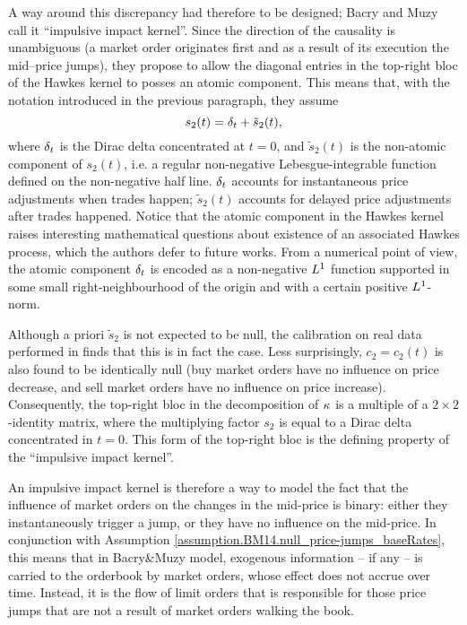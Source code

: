 \documentclass[10pt, article,table]{article}
\begin{document}
A way around this discrepancy had therefore to be designed; Bacry and Muzy call it ``impulsive impact kernel''. 
Since the direction of the causality is unambiguous (a market order originates first and as a result of its execution the mid--price jumps), they propose to allow the diagonal entries in the top-right bloc of the Hawkes kernel to posses an atomic component. This means that,  with the notation introduced in the previous paragraph, they assume 
\begin{equation*}
 s_2(t) = \delta_t + \tilde{s}_2(t),
\end{equation*}
where $\delta_t$ is the Dirac delta concentrated at $t=0$, and $\tilde{s}_2 (t)$ is the non-atomic component of $s_2(t)$, i.e. a regular non-negative Lebesgue-integrable function defined on the non-negative half line. $\delta_t$ accounts for instantaneous price adjustments when trades happen; $\tilde{s}_2 (t)$ accounts for delayed price adjustments after trades happened. Notice that the atomic component in the Hawkes kernel raises interesting mathematical questions about existence of an associated Hawkes process, which the authors defer to future works. From a numerical point of view, the atomic component $\delta_t$ is encoded as a non-negative $L^{1}$ function supported in some small right-neighbourhood of the origin and  with a certain positive $L^{1}$-norm. 

Although a priori $\tilde{s}_2$ is not expected to be null, the calibration on real data performed in \citealp{BM14haw} finds that this is in fact the  case. Less surprisingly, $c_2 = c_2 (t)$ is also found to be identically null (buy market orders have no influence on price decrease, and sell market orders have no influence on price increase).  Consequently, the top-right bloc in the decomposition of $\kappa$ is a multiple of a $2\times2$-identity matrix, where the multiplying factor $s_2$ is equal to a Dirac delta concentrated in $t=0$. This form of the top-right bloc is the defining property of the ``impulsive impact kernel''. 

An impulsive impact kernel is therefore a way to model the fact that the influence of market orders on the changes in the mid-price is binary: either they instantaneously trigger a jump, or they have no influence on the mid-price.  In conjunction with Assumption \ref{assumption.BM14.null_price-jumps_baseRates}, this means that in Bacry\&Muzy model, exogenous information -- if any -- is carried to the orderbook by market orders, whose effect does not accrue over time. Instead, it is the flow of limit orders that is responsible for those price jumps that are not a result of market orders walking the book.
\end{document}
